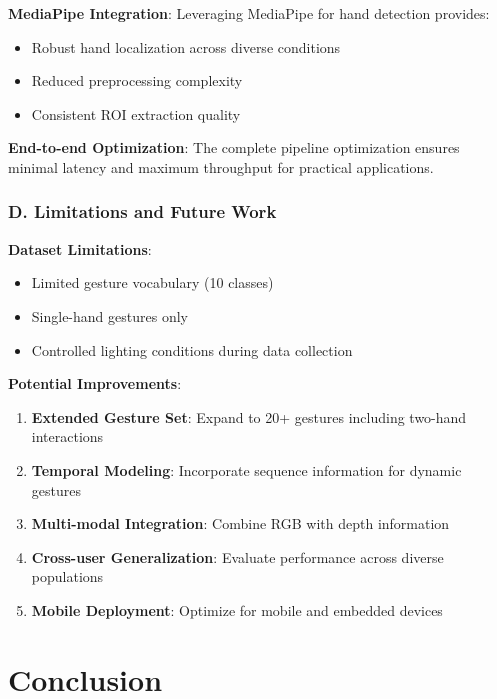 \documentclass[11pt,a4paper,twoside]{article}
\providecommand{\tightlist}{%
  \setlength{\itemsep}{0pt}\setlength{\parskip}{0pt}}
\begin{document}
\textbf{MediaPipe Integration}: Leveraging MediaPipe for hand detection
provides:

\begin{itemize}
\tightlist
\item
  Robust hand localization across diverse conditions
\item
  Reduced preprocessing complexity
\item
  Consistent ROI extraction quality
\end{itemize}

\textbf{End-to-end Optimization}: The complete pipeline optimization
ensures minimal latency and maximum throughput for practical
applications.

\subsubsection{D. Limitations and Future
Work}\label{d.-limitations-and-future-work}

\textbf{Dataset Limitations}:

\begin{itemize}
\tightlist
\item
  Limited gesture vocabulary (10 classes)
\item
  Single-hand gestures only
\item
  Controlled lighting conditions during data collection
\end{itemize}

\textbf{Potential Improvements}:

\begin{enumerate}
\def\labelenumi{\arabic{enumi}.}
\tightlist
\item
  \textbf{Extended Gesture Set}: Expand to 20+ gestures including
  two-hand interactions
\item
  \textbf{Temporal Modeling}: Incorporate sequence information for
  dynamic gestures
\item
  \textbf{Multi-modal Integration}: Combine RGB with depth information
\item
  \textbf{Cross-user Generalization}: Evaluate performance across
  diverse populations
\item
  \textbf{Mobile Deployment}: Optimize for mobile and embedded devices
\end{enumerate}

\section{Conclusion}\label{vii.-conclusion}
\end{document}
